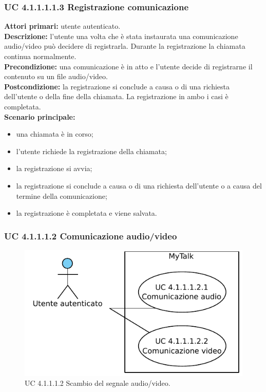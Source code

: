 \subsubsection{UC 4.1.1.1.1.3 Registrazione comunicazione}
\noindent 
\textbf{Attori primari:} utente autenticato.\\
\textbf{Descrizione:} l'utente una volta che è stata instaurata una comunicazione audio/video può decidere di registrarla. Durante la registrazione la chiamata continua normalmente.\\
\textbf{Precondizione:} una comunicazione è in atto e l'utente decide di registrarne il contenuto su un file audio/video.\\
\textbf{Postcondizione:} la registrazione si conclude a causa o di una richiesta dell'utente o della fine della chiamata. La registrazione in ambo i casi è completata.\\
\textbf{Scenario principale:}
\begin{itemize}
\item una chiamata è in corso;
\item l'utente richiede la registrazione della chiamata;
\item la registrazione si avvia;
\item la registrazione si conclude a causa o di una richiesta dell'utente o a causa del termine della comunicazione;
\item la registrazione è completata e viene salvata.
\end{itemize}

\newpage

\subsubsection{UC 4.1.1.1.2 Comunicazione audio/video}

\begin{figure}[htbp]
\centering
\includegraphics[scale=0.7]{./casi_uso/UC4-1-1-1-2.pdf}
\caption{UC 4.1.1.1.2 Scambio del segnale audio/video.}
\end{figure}

